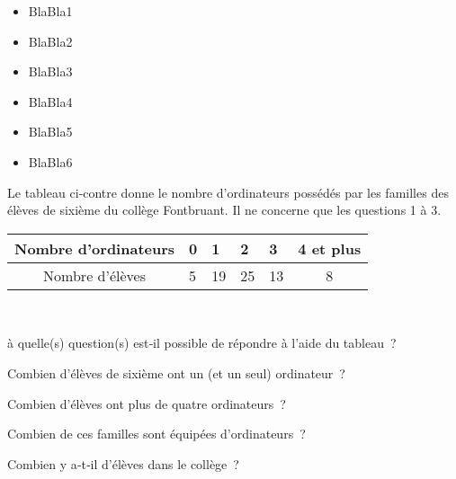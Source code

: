 \begin{acquis}
\begin{itemize}
\item BlaBla1
\item BlaBla2
\item BlaBla3
\item BlaBla4
\item BlaBla5
\item BlaBla6
\end{itemize}
\end{acquis}


\begin{QCM}
  \begin{GroupeQCM}
  \begin{minipage}[c]{0.44\linewidth}
  Le tableau ci‑contre donne le nombre d'ordinateurs possédés par les familles des élèves de sixième du collège Fontbruant. Il ne concerne que les questions 1 à 3.
   \end{minipage} \hfill%
   \begin{minipage}[c]{0.52\linewidth}
   \begin{center}
    \begin{tabularx}{\linewidth}{|c|X|X|X|X|c|}
    \hline
    Nombre d'ordinateurs & 0 & 1 & 2 & 3 & 4 et plus \\\hline
    Nombre d'élèves & 5 & 19 & 25 & 13 & 8 \\\hline
  \end{tabularx}
   \end{center}
    \end{minipage}\\[1em]
    
    \begin{exercice}
      à quelle(s) question(s) est‑il possible de répondre à l'aide du tableau ?
      \begin{ChoixQCM}{4}
      \item Combien d'élèves de sixième ont un (et un seul) ordinateur ?
      \item Combien d'élèves ont plus de quatre ordinateurs ?
      \item Combien de ces familles sont équipées d'ordinateurs ?
      \item Combien y a‑t‑il d'élèves dans le collège ?
      \end{ChoixQCM}
\begin{corrige}
   \end{corrige}
    \end{exercice}
    

\end{GroupeQCM}
\end{QCM}
